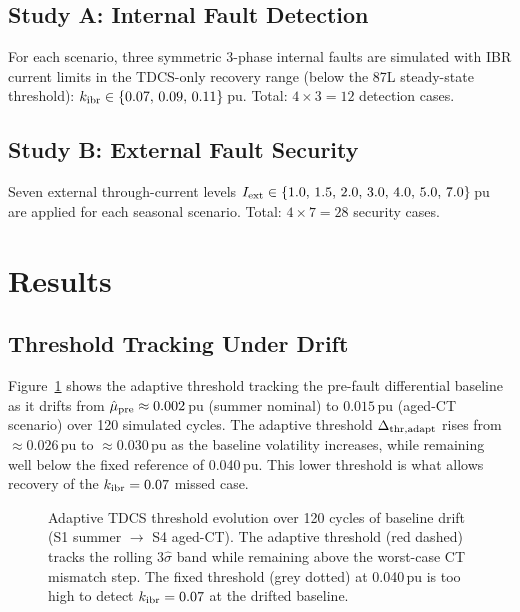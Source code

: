 \documentclass[11pt,a4paper]{article}
\begin{document}
\subsection{Study A: Internal Fault Detection}

For each scenario, three symmetric 3-phase internal faults are simulated
with IBR current limits in the TDCS-only recovery range (below the 87L
steady-state threshold):
$k_{\rm ibr} \in \{0.07,\,0.09,\,0.11\}$\,pu.
Total: $4 \times 3 = 12$ detection cases.

\subsection{Study B: External Fault Security}

Seven external through-current levels
$I_{\rm ext} \in \{1.0,\,1.5,\,2.0,\,3.0,\,4.0,\,5.0,\,7.0\}$\,pu
are applied for each seasonal scenario.
Total: $4 \times 7 = 28$ security cases.

\section{Results}

\subsection{Threshold Tracking Under Drift}

Figure~\ref{fig:tracking} shows the adaptive threshold tracking the
pre-fault differential baseline as it drifts from
$\hat{\mu}_{\rm pre}\approx 0.002$\,pu (summer nominal) to
$0.015$\,pu (aged-CT scenario) over 120 simulated cycles.
The adaptive threshold $\Delta_{\rm thr,adapt}$ rises from
$\approx\!0.026$\,pu to $\approx\!0.030$\,pu as the baseline volatility
increases, while remaining well below the fixed reference of 0.040\,pu.
This lower threshold is what allows recovery of the $k_{\rm ibr}=0.07$
missed case.

\begin{figure}[h!]
  \centering
  
  \caption{Adaptive TDCS threshold evolution over 120 cycles of baseline drift
           (S1 summer $\to$ S4 aged-CT).  The adaptive threshold (red dashed)
           tracks the rolling $3\hat{\sigma}$ band while remaining above the
           worst-case CT mismatch step.  The fixed threshold (grey dotted) at
           0.040\,pu is too high to detect $k_{\rm ibr}=0.07$ at the drifted
           baseline.}
  \label{fig:tracking}
\end{figure}
\end{document}
